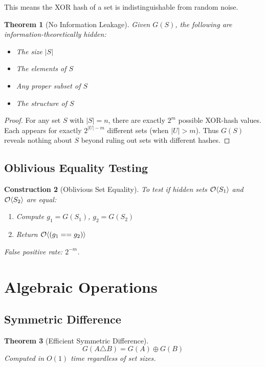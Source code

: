 \documentclass[11pt,final,hidelinks]{article}
\newcommand{\XOR}{\oplus}
\newcommand{\SymDiff}{\triangle}
\newtheorem{theorem}{Theorem}[section]
\newtheorem{construction}[theorem]{Construction}
\begin{document}
This means the XOR hash of a set is indistinguishable from random noise.

\begin{theorem}[No Information Leakage]
Given $G(S)$, the following are information-theoretically hidden:
\begin{itemize}
    \item The size $|S|$
    \item The elements of $S$
    \item Any proper subset of $S$
    \item The structure of $S$
\end{itemize}
\end{theorem}

\begin{proof}
For any set $S$ with $|S| = n$, there are exactly $2^m$ possible XOR-hash values. Each appears for exactly $2^{|U|-m}$ different sets (when $|U| > m$). Thus $G(S)$ reveals nothing about $S$ beyond ruling out sets with different hashes.
\end{proof}

\subsection{Oblivious Equality Testing}

\begin{construction}[Oblivious Set Equality]
To test if hidden sets $\mathcal{O}\langle S_1 \rangle$ and $\mathcal{O}\langle S_2 \rangle$ are equal:
\begin{enumerate}
    \item Compute $g_1 = G(S_1)$, $g_2 = G(S_2)$
    \item Return $\mathcal{O}\langle (g_1 == g_2) \rangle$
\end{enumerate}
False positive rate: $2^{-m}$.
\end{construction}

\section{Algebraic Operations}

\subsection{Symmetric Difference}

\begin{theorem}[Efficient Symmetric Difference]
\begin{equation}
G(A \SymDiff B) = G(A) \XOR G(B)
\end{equation}
Computed in $O(1)$ time regardless of set sizes.
\end{theorem}
\end{document}
